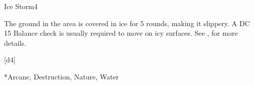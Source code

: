 \begin{spellsection}{Ice Storm}{4}
    \begin{spellheader}
    \end{spellheader}
    \begin{spellcontent}
        \begin{spelltargetinginfo}
        \end{spelltargetinginfo}
        \begin{spelleffects}
            \spelleffect The ground in the area is covered in ice for 5 rounds, making it slippery. A DC 15 Balance check is usually required to move on icy surfaces. See , for more details.
        \end{spelleffects}
    \end{spellcontent}
    \begin{spellsubcontent}
        \begin{spelltargetinginfo}
        \end{spelltargetinginfo}
        \begin{spelleffects}
            \spelleffect {}[d4]
        \end{spelleffects}
    \end{spellsubcontent}
    \begin{spellfooter}
        *{Arcane, Destruction, Nature, Water}
        \spellnotes \destructivespellnotes
        \miscastyou
    \end{spellfooter}
\end{spellsection}

